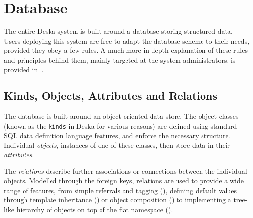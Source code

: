 \documentclass[deska]{subfiles}
\begin{document}
\section{Database}

The entire Deska system is built around a database storing structured data.  Users deploying this system are free to
adapt the database scheme to their needs, provided they obey a few rules.  A much more in-depth explanation of these
rules and principles behind them, mainly targeted at the system administrators, is provided
in~.

\subsection{Kinds, Objects, Attributes and Relations}

The database is built around an object-oriented data store.  The object classes (known as the {\tt kinds} in Deska for
various reasons) are defined using standard SQL data definition language features, and enforce the necessary structure.
Individual {\em objects}, instances of one of these classes, then store data in their {\em attributes}.

The {\em relations} describe further associations or connections between the individual objects.  Modelled through the
foreign keys, relations are used to provide a wide range of features, from simple referrals and tagging
(), defining default values through template inheritance
() or object composition () to implementing a tree-like
hierarchy of objects on top of the flat namespace ().
\end{document}
